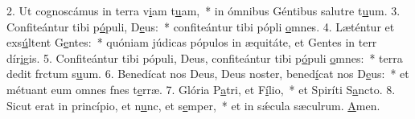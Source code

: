 2. Ut cognoscámus in terra v\uline{i}am t\uline{u}am,~* in ómnibus Géntibus salutre t\uline{u}um.
3. Confiteántur tibi p\uline{ó}puli, D\uline{e}us:~* confiteántur tibi pópli \uline{o}mnes.
4. Læténtur et exs\uline{ú}ltent G\uline{e}ntes:~* quóniam júdicas pópulos in æquitáte, et Gentes in terr dír\uline{i}gis.
5. Confiteántur tibi pópuli, Deus, confiteántur tibi p\uline{ó}puli \uline{o}mnes:~* terra dedit frctum s\uline{u}um.
6. Benedícat nos Deus, Deus noster, bened\uline{í}cat nos D\uline{e}us:~* et métuant eum omnes fnes t\uline{e}rræ.
7. Glória P\uline{a}tri, et F\uline{í}lio,~* et Spiríti S\uline{a}ncto.
8. Sicut erat in princípio, et n\uline{u}nc, et s\uline{e}mper,~* et in sǽcula sæculrum. \uline{A}men.
